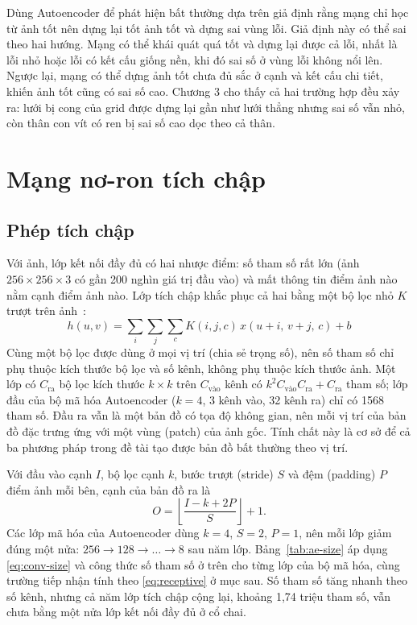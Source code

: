 Dùng Autoencoder để phát hiện bất thường dựa trên giả định rằng mạng chỉ học từ ảnh tốt nên dựng lại tốt ảnh tốt và
dựng sai vùng lỗi. Giả định này có thể sai theo hai hướng. Mạng có thể khái quát quá tốt và dựng lại được cả lỗi, nhất
là lỗi nhỏ hoặc lỗi có kết cấu giống nền, khi đó sai số ở vùng lỗi không nổi lên. Ngược lại, mạng có thể dựng ảnh tốt
chưa đủ sắc ở cạnh và kết cấu chi tiết, khiến ảnh tốt cũng có sai số cao. Chương 3 cho thấy cả hai trường hợp đều
xảy ra: lưới bị cong của grid được dựng lại gần như lưới thẳng nhưng sai số vẫn nhỏ, còn thân con vít có ren bị sai số
cao dọc theo cả thân.

\section{Mạng nơ-ron tích chập}
\label{sec:cnn}

\subsection{Phép tích chập}

Với ảnh, lớp kết nối đầy đủ có hai nhược điểm: số tham số rất lớn (ảnh $256\times256\times3$ có gần 200 nghìn
giá trị đầu vào) và mất thông tin điểm ảnh nào nằm cạnh điểm ảnh nào. Lớp tích chập khắc phục cả hai bằng một
bộ lọc nhỏ $K$ trượt trên ảnh~\cite{lecunGradientbasedLearningApplied1998}:
\begin{equation}
  h(u,v) = \sum_{i}\sum_{j}\sum_{c} K(i,j,c)\, x(u+i,\, v+j,\, c) + b
  \label{eq:conv}
\end{equation}
Cùng một bộ lọc được dùng ở mọi vị trí (chia sẻ trọng số), nên số tham số chỉ phụ thuộc kích thước bộ lọc và số
kênh, không phụ thuộc kích thước ảnh. Một lớp có $C_{\text{ra}}$ bộ lọc kích thước $k\times k$ trên $C_{\text{vào}}$
kênh có $k^2 C_{\text{vào}} C_{\text{ra}} + C_{\text{ra}}$ tham số; lớp đầu của bộ mã hóa Autoencoder ($k = 4$, 3 kênh
vào, 32 kênh ra) chỉ có 1568 tham số. Đầu ra vẫn là một bản đồ có tọa độ không gian, nên mỗi vị trí của bản đồ
đặc trưng ứng với một vùng (patch) của ảnh gốc. Tính chất này là cơ sở để cả ba phương pháp trong đề tài tạo
được bản đồ bất thường theo vị trí.

Với đầu vào cạnh $I$, bộ lọc cạnh $k$, bước trượt (stride) $S$ và đệm (padding) $P$ điểm ảnh mỗi bên, cạnh của bản đồ
ra là
\begin{equation}
  O = \left\lfloor \frac{I - k + 2P}{S} \right\rfloor + 1 .
  \label{eq:conv-size}
\end{equation}
Các lớp mã hóa của Autoencoder dùng $k = 4$, $S = 2$, $P = 1$, nên mỗi lớp giảm đúng một nửa: $256 \to 128 \to \dots
\to 8$ sau năm lớp. Bảng~\ref{tab:ae-size} áp dụng \eqref{eq:conv-size} và công thức số tham số ở trên cho từng lớp
của bộ mã hóa, cùng trường tiếp nhận tính theo \eqref{eq:receptive} ở mục sau. Số tham số tăng nhanh theo số kênh,
nhưng cả năm lớp tích chập cộng lại, khoảng 1,74 triệu tham số, vẫn chưa bằng một nửa lớp kết nối đầy đủ ở cổ chai.

